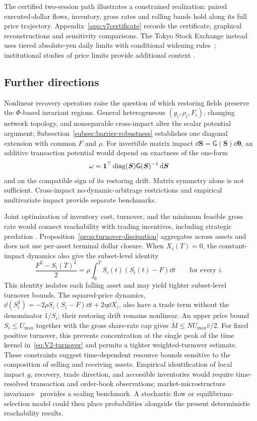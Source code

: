 \documentclass[review,hidelinks,onefignum,onetabnum]{siamonline250211}
\begin{document}
The certified two-session path illustrates a constrained realization:
paired executed-dollar flows, inventory, gross rates and rolling
bands hold along its full price trajectory. Appendix~\ref{app:v7certificate} records the certificate, graphical
reconstructions and sensitivity comparisons. The Tokyo Stock
Exchange instead uses tiered absolute-yen daily limits with
conditional widening rules~\citep{JPX2026};
institutional studies of price limits provide additional context
\citep{KimRhee1997,Chen2019}.

\subsection{Further directions}
Nonlinear recovery operators raise the question of which restoring fields preserve the $\Phi$-based invariant regions. General heterogeneous $(g_i,\rho_i,F_i)$, changing network topology, and nonseparable cross-impact alter the scalar potential argument; Subsection~\ref{subsec:barrier-robustness} establishes one diagonal extension with common $F$ and $\rho$. For invertible matrix impact $\dd\bm S=\mathsf G(\bm S)\dd\bm\theta$, an additive transaction potential would depend on exactness of the one-form
\[
\omega=\mathbf{1}^\top\operatorname{diag}(\bm S)\mathsf G(\bm S)^{-1}\,\mathrm{d}\bm S
\]
and on the compatible sign of its restoring drift. Matrix symmetry alone is not sufficient. Cross-impact no-dynamic-arbitrage restrictions \citep{AlfonsiKlockSchied2016,SchneiderLillo2019} and empirical multivariate impact \citep{BenzaquenEtAl2017} provide separate benchmarks.

Joint optimization of inventory cost, turnover, and the minimum feasible gross rate would connect reachability with trading incentives, including strategic predation \citep{BrunnermeierPedersen2005}. Proposition~\ref{prop:turnover-dissipation} aggregates across assets and does not use per-asset terminal dollar closure. When $X_i(T)=0$, the constant-impact dynamics also give the subset-level identity
\[
\frac{F^2-S_i(T)^2}{2}
=\rho\int_0^T S_i(t)(S_i(t)-F)\dd t
\qquad\text{for every }i.
\]
This identity isolates each falling asset and may yield tighter subset-level turnover bounds. The squared-price dynamics,
$\dd(S_i^2)=-2\rho S_i(S_i-F)\dd t+2\eta\dd X_i$,
also have a trade term without the denominator $1/S_i$; their restoring drift remains nonlinear. An upper price bound $S_i\le U_{\max}$ together with the gross share-rate cap gives
$\dot M\le NU_{\max}\bar v/2$. For fixed positive turnover, this prevents concentration at the single peak of the time kernel in~\eqref{eq:V2-turnover} and permits a tighter weighted-turnover estimate. These constraints suggest time-dependent resource bounds sensitive to the composition of selling and receiving assets. Empirical identification of local impact $g$, recovery, trade direction, and accessible inventories would require time-resolved transaction and order-book observations; market-microstructure invariance~\citep{KyleObizhaeva2023} provides a scaling benchmark. A stochastic flow or equilibrium-selection model could then place probabilities alongside the present deterministic reachability results.
\end{document}
